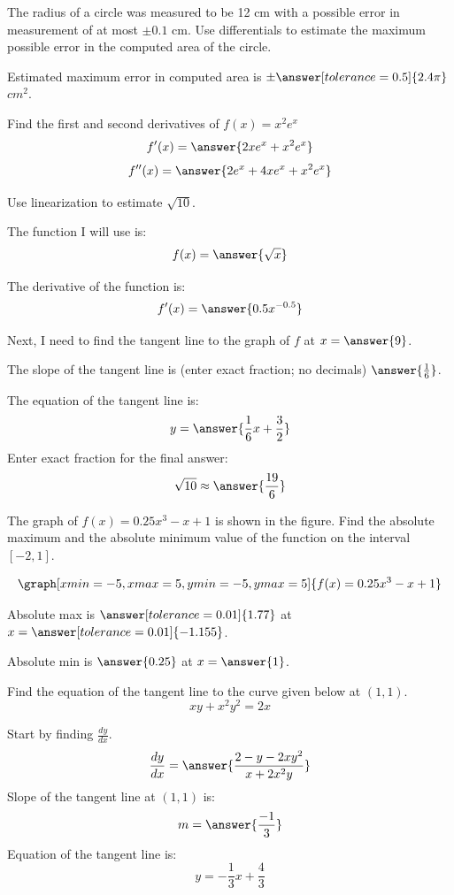 \documentclass{ximera}
\begin{document}
\begin{problem}\label{prob:mth240exam2prob5}
The radius of a circle was measured to be 12 cm with a possible error in measurement of at most $\pm 0.1$ cm.  Use differentials to estimate the maximum possible error in the computed area of the circle.

Estimated maximum error in computed area is $\pm\answer[tolerance=0.5]{2.4\pi}$ $cm^2$.
\end{problem}

\begin{problem}\label{prob:mth240exam2prob6}
Find the first and second derivatives of $f(x)=x^2e^x$
$$f'(x)=\answer{2xe^x+x^2e^x}$$
$$f''(x)=\answer{2e^x+4xe^x+x^2e^x}$$
\end{problem}

\begin{problem}\label{prob:mth240exam2prob7}
Use linearization to estimate $\sqrt{10}$.

The function I will use is:
$$f(x)=\answer{\sqrt{x}}$$

The derivative of the function is:
$$f'(x)=\answer{0.5x^{-0.5}}$$

Next, I need to find the tangent line to the graph of $f$ at $x=\answer{9}$.

The slope of the tangent line is (enter exact fraction; no decimals) $\answer{\frac{1}{6}}$.

The equation of the tangent line is:
$$y=\answer{\frac{1}{6}x+\frac{3}{2}}$$
Enter exact fraction for the final answer:
$$\sqrt{10}\approx \answer{\frac{19}{6}}$$
\end{problem}

\begin{problem}\label{prob:mth240exam2prob8}
The graph of $f(x)=0.25x^3-x+1$ is shown in the figure.  Find the absolute maximum and the absolute minimum value of the function on the interval $[-2, 1]$.
 
\[
\graph[xmin=-5,xmax=5,ymin=-5,ymax=5]{f(x)=0.25x^3-x+1} 
\]

    Absolute max is $\answer[tolerance=0.01]{1.77}$ at $x=\answer[tolerance=0.01]{-1.155}$.
    
    Absolute min is $\answer{0.25}$ at $x=\answer{1}$.
\end{problem}

\begin{problem}\label{prob:mth240exam2prob9}
Find the equation of the tangent line to the curve given below at $(1,1)$.
$$xy+x^2y^2=2x$$

Start by finding $\frac{dy}{dx}$.
$$\frac{dy}{dx}=\answer{\frac{2-y-2xy^2}{x+2x^2y}}$$
Slope of the tangent line at $(1,1)$ is:
$$m=\answer{\frac{-1}{3}}$$
Equation of the tangent line is:
$$y=-\frac{1}{3}x+\frac{4}{3}$$
\end{problem}
\end{document}

